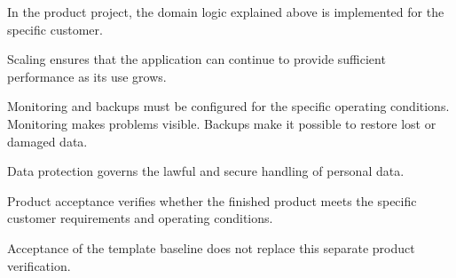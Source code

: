 \begin{beginnerstatement}

In the product project, the domain logic explained above is implemented for
the specific customer.

Scaling ensures that the application can continue to provide sufficient
performance as its use grows.

Monitoring and backups must be configured for the specific operating
conditions. Monitoring makes problems visible. Backups make it possible to
restore lost or damaged data.

Data protection governs the lawful and secure handling of personal data.

Product acceptance verifies whether the finished product meets the specific
customer requirements and operating conditions.

Acceptance of the template baseline does not replace this separate product
verification.

\end{beginnerstatement}
